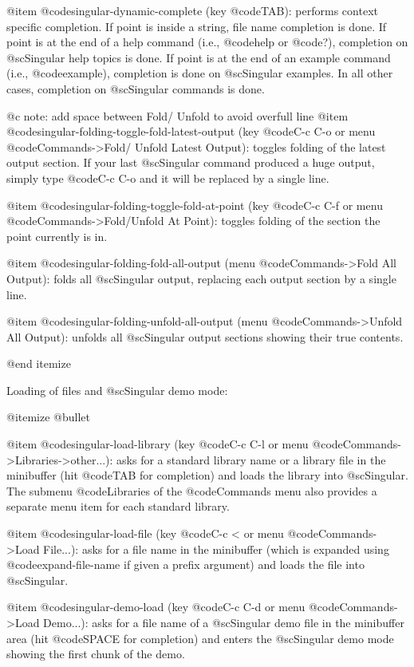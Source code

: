 @item @code{singular-dynamic-complete} (key @code{TAB}): performs
context specific completion. If point is inside a string, file name
completion is done. If point is at the end of a help command (i.e.,
@code{help} or @code{?}), completion on @sc{Singular} help topics is
done. If point is at the end of an example command (i.e.,
@code{example}), completion is done on @sc{Singular} examples. In all
other cases, completion on @sc{Singular} commands is done.

@c note: add space between Fold/ Unfold to avoid overfull line
@item @code{singular-folding-toggle-fold-latest-output} (key @code{C-c
C-o} or menu @code{Commands->Fold/ Unfold Latest Output}): toggles
folding of the latest output section. If your last @sc{Singular} command
produced a huge output, simply type @code{C-c C-o} and it will be
replaced by a single line.

@item @code{singular-folding-toggle-fold-at-point} (key @code{C-c C-f}
or menu @code{Commands->Fold/Unfold At Point}): toggles folding of the
section the point currently is in.

@item @code{singular-folding-fold-all-output} (menu @code{Commands->Fold
All Output}): folds all @sc{Singular} output, replacing each output
section by a single line.

@item @code{singular-folding-unfold-all-output} (menu
@code{Commands->Unfold All Output}): unfolds all @sc{Singular} output
sections showing their true contents.

@end itemize

Loading of files and @sc{Singular} demo mode:

@itemize @bullet

@item @code{singular-load-library} (key @code{C-c C-l} or menu
@code{Commands->Libraries->other...}): asks for a standard library name
or a library file in the minibuffer (hit @code{TAB} for completion) and
loads the library into @sc{Singular}. The submenu @code{Libraries} of
the @code{Commands} menu also provides a separate menu item for each
standard library.

@item @code{singular-load-file} (key @code{C-c <} or menu
@code{Commands->Load File...}): asks for a file name in the minibuffer
(which is expanded using @code{expand-file-name} if given a prefix
argument) and loads the file into @sc{Singular}.

@item @code{singular-demo-load} (key @code{C-c C-d} or menu
@code{Commands->Load Demo...}): asks for a file name of a @sc{Singular}
demo file in the minibuffer area (hit @code{SPACE} for completion) and
enters the @sc{Singular} demo mode showing the first chunk of the demo.

